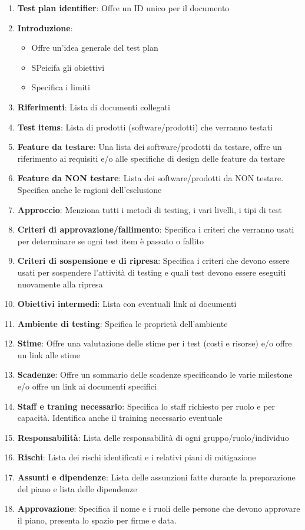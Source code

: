 \documentclass[11pt,a4paper]{book}
\begin{document}
\begin{enumerate}
	\item \textbf{Test plan identifier}: Offre un ID unico per il documento
	\item \textbf{Introduzione}:
		\begin{itemize}
			\item Offre un'idea generale del test plan
			\item SPeicifa gli obiettivi
			\item Specifica i limiti
		\end{itemize}
	\item \textbf{Riferimenti}: Lista di documenti collegati
	\item \textbf{Test items}: Lista di prodotti (software/prodotti) che verranno testati
	\item \textbf{Feature da testare}: Una lista dei software/prodotti da testare, offre un riferimento ai requisiti e/o alle specifiche di design delle feature da testare
	\item \textbf{Feature da NON testare}: Lista dei software/prodotti da NON testare. Specifica anche le ragioni dell'esclusione
	\item \textbf{Approccio}: Menziona tutti i metodi di testing, i vari livelli, i tipi di test
	\item \textbf{Criteri di approvazione/fallimento}: Specifica i criteri che verranno usati per determinare se ogni test item è passato o fallito
	\item \textbf{Criteri di sospensione e di ripresa}: Specifica i criteri che devono essere usati per sospendere l'attività di testing e quali test devono essere eseguiti nuovamente alla ripresa
	\item \textbf{Obiettivi intermedi}: Lista con eventuali link ai documenti
	\item \textbf{Ambiente di testing}: Spcifica le proprietà dell'ambiente
	\item \textbf{Stime}: Offre una valutazione delle stime per i test (costi e risorse) e/o offre un link alle stime
	\item \textbf{Scadenze}: Offre un sommario delle scadenze specificando le varie milestone e/o offre un link ai documenti specifici
	\item \textbf{Staff e traning necessario}: Specifica lo staff richiesto per ruolo e per capacità. Identifica anche il training necessario eventuale
	\item \textbf{Responsabilità}: Lista delle responsabilità di ogni gruppo/ruolo/individuo
	\item \textbf{Rischi}: Lista dei rischi identificati e i relativi piani di mitigazione
	\item \textbf{Assunti e dipendenze}: Lista delle assunzioni fatte durante la preparazione del piano e lista delle dipendenze
	\item \textbf{Approvazione}: Specifica il nome e i ruoli delle persone che devono approvare il piano, presenta lo spazio per firme e data.
\end{enumerate}
\end{document}
